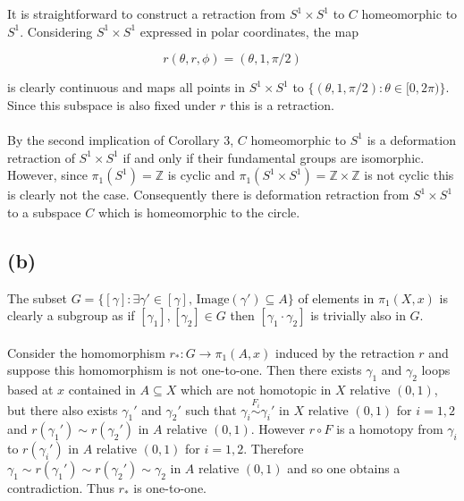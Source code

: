 \documentclass{article}
\begin{document}

It is straightforward to construct a retraction from $S^1 \times S^1$ to $C$ homeomorphic to 
$S^1$. Considering $S^1 \times S^1$ expressed in polar coordinates, the map 

\begin{equation*}
    r(\theta,r,\phi) = (\theta,1,\pi/2)
\end{equation*}

is clearly continuous and maps all points in $S^1\times S^1$ to $\{(\theta,1,\pi/2):\theta \in [0,2\pi)\}$.
Since this subspace is also fixed under $r$ this is a retraction.

\paragraph{}
By the second implication of Corollary 3, $C$ homeomorphic to $S^1$ is a deformation 
retraction of $S^1 \times S^1$ if and only if their fundamental groups are isomorphic. However, 
since $\pi_1(S^1) = \mathbb{Z}$ is cyclic and $\pi_1(S^1 \times S^1) = \mathbb{Z} \times \mathbb{Z}$ 
is not cyclic this is clearly not the case. Consequently there is deformation retraction 
from $S^1 \times S^1$ to a subspace $C$ which is homeomorphic to the circle.

\subsection*{(b)}
The subset $G = \{[\gamma]:\exists \gamma' \in [\gamma],\, \text{Image}(\gamma') \subseteq A\}$ of elements 
in $\pi_1(X,x)$ is clearly a subgroup as if $[\gamma_1],[\gamma_2] \in G$ then $[\gamma_1 \cdot \gamma_2]$ 
is trivially also in $G$.

\paragraph{}
Consider the homomorphism $r_*:G \rightarrow \pi_1(A,x)$ induced by the retraction $r$ 
and suppose this homomorphism is not one-to-one. Then there exists $\gamma_1$ and $\gamma_2$ loops based at 
$x$ contained in $A \subseteq X$ which are not homotopic in $X$ relative $(0,1)$, but there also exists 
$\gamma_1'$ and $\gamma_2'$ such that $\gamma_i \overset{F_i}\sim \gamma_i'$ in $X$ relative $(0,1)$ for $i = 1,2$ 
and $r(\gamma_1') \sim r(\gamma_2')$ in $A$ relative $(0,1)$. However $r \circ F$ is a homotopy from 
$\gamma_i$ to $r(\gamma_i')$ in $A$ relative $(0,1)$ for $i = 1,2$. Therefore $\gamma_1 \sim r(\gamma_1') \sim r(\gamma_2') \sim \gamma_2$ 
in $A$ relative $(0,1)$ and so one obtains a contradiction. Thus $r_*$ is one-to-one.
\end{document}
